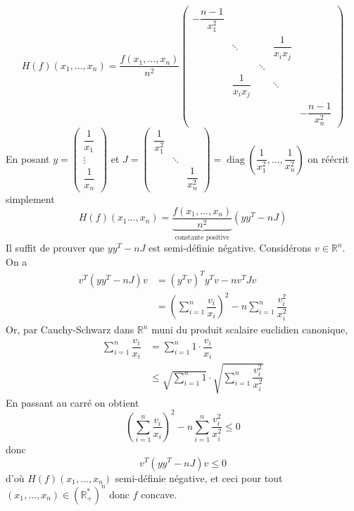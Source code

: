 \documentclass{fancybook}
\DeclareMathOperator{\diag}{diag}
\begin{document}
\[
   H(f)(x_1,\ldots,x_n) = \dfrac{f(x_1,\ldots, x_n)}{n^2} \left(
    \begin{array}{ccccc}
    -\dfrac{n-1}{x_1^2}                                    \\
      & \ddots             &   & \dfrac{1}{x_i x_j}\\
      &               & \ddots                \\
      & \dfrac{1}{x_i x_j} &   & \ddots            \\
      &               &   &   & -\dfrac{n-1}{x_n^2}
    \end{array}
    \right)
\]  
En posant $y=\begin{pmatrix}
\dfrac 1{x_1}\\
\vdots\\
\dfrac 1{x_n}
\end{pmatrix}$ et $J=\begin{pmatrix}
\dfrac 1{x_1^2} \\
& \ddots \\
&& \dfrac 1{x_n^2}
\end{pmatrix}=\diag(\dfrac 1{x_1^2},\ldots,\dfrac 1{x_n^2})$ \newline
on réécrit simplement $$H(f)(x_1\ldots,x_n)=\underbrace{\dfrac{f(x_1,\ldots, x_n)}{n^2}}_{\text{constante positive}}(yy^T-nJ)$$
Il suffit de prouver que $yy^T-nJ$ est semi-définie négative. Considérons $v\in \mathbb R^n$.
On a $$\begin{aligned}
v^T(yy^T-nJ)v &= (y^Tv)^Ty^Tv-nv^TJv\\
&= \left(\sum_{i=1}^n \dfrac{v_i}{x_i}\right)^2 - n \sum_{i=1}^n \dfrac{v_i^2}{x_i^2}
\end{aligned}$$
Or, par Cauchy-Schwarz dans $\mathbb R^n$ muni du produit scalaire euclidien canonique,
$$\begin{aligned} \sum_{i=1}^n \dfrac{v_i}{x_i} &= \sum_{i=1}^n 1\cdot \dfrac{v_i}{x_i}\\
&\leq \sqrt{\sum_{i=1}^n 1} \cdot \sqrt{\sum_{i=1}^n \dfrac{v_i^2}{x_i^2}}
\end{aligned}$$
En passant au carré on obtient $$\left(\sum_{i=1}^n \dfrac{v_i}{x_i}\right)^2 - n \sum_{i=1}^n \dfrac{v_i^2}{x_i^2}\leq 0$$ donc $$v^T(yy^T-nJ)v\leq 0$$ d'où $H(f)(x_1,\ldots,x_n)$ semi-définie négative, et ceci pour tout $(x_1,\ldots,x_n)\in (\mathbb R^*_+)^n $ donc $f$ concave.
\end{document}

